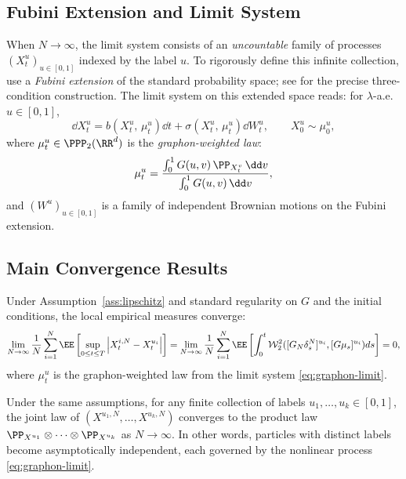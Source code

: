 \documentclass[11pt]{article}
\begin{document}
\subsection{Fubini Extension and Limit System}\label{sec:fubini}

When $N \to \infty$, the limit system consists of an \emph{uncountable} family of processes $(X_t^u)_{u \in [0,1]}$ indexed by the label $u$. To rigorously define this infinite collection, \citet{coppini2025graphon} use a \emph{Fubini extension} of the standard probability space; see \citet[Definition~3.1]{coppini2025graphon} for the precise three-condition construction. The limit system on this extended space reads: for $\lambda$-a.e.\ $u \in [0,1]$,
\begin{equation}\label{eq:graphon-limit}
  \dd X_t^u = b\!\left(X_t^u, \, \mu_t^u\right)\dd t + \sigma\!\left(X_t^u, \, \mu_t^u\right)\dd W_t^u, \qquad X_0^u \sim \mu_0^u,
\end{equation}
where $\mu_t^u \in \PPP_2(\RR^d)$ is the \emph{graphon-weighted law}:
\begin{equation}\label{eq:graphon-law}
  \mu_t^u = \frac{\int_0^1 G(u,v)\,\PP_{X_t^v}\,\dd v}{\int_0^1 G(u,v)\,\dd v},
\end{equation}
and $(W^u)_{u \in [0,1]}$ is a family of independent Brownian motions on the Fubini extension.

\subsection{Main Convergence Results}

\begin{theorem}\label{thm:lln}
  Under Assumption~\ref{ass:lipschitz} and standard regularity on $G$ and the initial conditions, the local empirical measures converge:
  \begin{equation}
    \lim_{N \to \infty} \frac{1}{N} \sum_{i=1}^N \EE\left[ \sup_{0 \leq t \leq T} \left| X_t^{i, N} - X_t^{u_i} \right| \right] = \lim_{N \to \infty} \frac{1}{N} \sum_{i=1}^N \EE\left[ \int_{0}^{t} \mathcal{W}_2^2 ([G_N \delta_s^N]^{u_i}, [G\mu_s]^{u_i}) ds \right] = 0,
  \end{equation}
  where $\mu_t^u$ is the graphon-weighted law from the limit system \eqref{eq:graphon-limit}.
\end{theorem}

\begin{theorem}\label{thm:poc}
  Under the same assumptions, for any finite collection of labels $u_1, \ldots, u_k \in [0,1]$, the joint law of $(X^{u_1,N}, \ldots, X^{u_k,N})$ converges to the product law $\PP_{X^{u_1}} \otimes \cdots \otimes \PP_{X^{u_k}}$ as $N \to \infty$. In other words, particles with distinct labels become asymptotically independent, each governed by the nonlinear process \eqref{eq:graphon-limit}.
\end{theorem}
\end{document}
